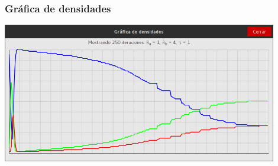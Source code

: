 \documentclass[12pt,letterpaper,oneside]{report}
\begin{document}
	\subsubsection{Gráfica de densidades}
	\begin{center}
		\includegraphics[width=12cm]{img/tiempo/min/g.png}
	\end{center}
\end{document}
